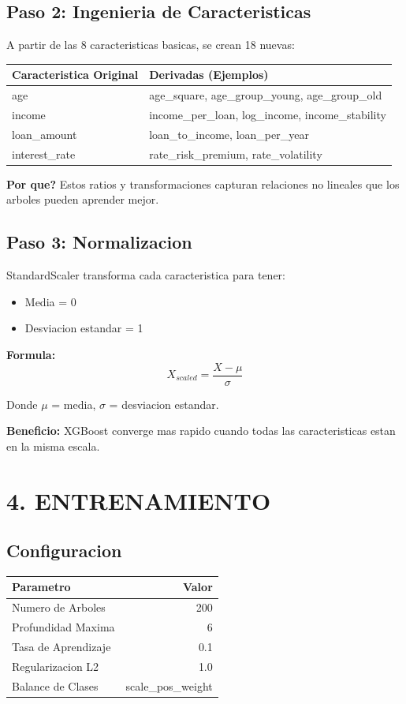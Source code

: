 \documentclass[11pt]{article}
\begin{document}
\subsection*{Paso 2: Ingenieria de Caracteristicas}

A partir de las 8 caracteristicas basicas, se crean 18 nuevas:

\begin{tabular}{|l|l|}
\hline
\textbf{Caracteristica Original} & \textbf{Derivadas (Ejemplos)} \\
\hline
age & age\_square, age\_group\_young, age\_group\_old \\
income & income\_per\_loan, log\_income, income\_stability \\
loan\_amount & loan\_to\_income, loan\_per\_year \\
interest\_rate & rate\_risk\_premium, rate\_volatility \\
\hline
\end{tabular}

\textbf{Por que?} Estos ratios y transformaciones capturan relaciones no lineales que los arboles pueden aprender mejor.

\subsection*{Paso 3: Normalizacion}

StandardScaler transforma cada caracteristica para tener:
\begin{itemize}
\item Media = 0
\item Desviacion estandar = 1
\end{itemize}

\textbf{Formula:}
$$X_{scaled} = \frac{X - \mu}{\sigma}$$

Donde $\mu$ = media, $\sigma$ = desviacion estandar.

\textbf{Beneficio:} XGBoost converge mas rapido cuando todas las caracteristicas estan en la misma escala.

\section*{4. ENTRENAMIENTO}

\subsection*{Configuracion}

\begin{tabular}{|l|r|}
\hline
\textbf{Parametro} & \textbf{Valor} \\
\hline
Numero de Arboles & 200 \\
Profundidad Maxima & 6 \\
Tasa de Aprendizaje & 0.1 \\
Regularizacion L2 & 1.0 \\
Balance de Clases & scale\_pos\_weight \\
\hline
\end{tabular}
\end{document}
